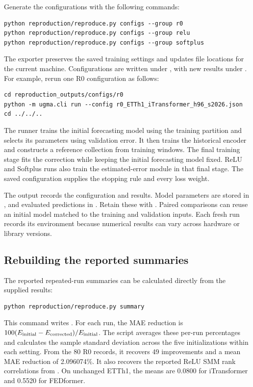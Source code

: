 Generate the configurations with the following commands:
\begin{lstlisting}
python reproduction/reproduce.py configs --group r0
python reproduction/reproduce.py configs --group relu
python reproduction/reproduce.py configs --group softplus
\end{lstlisting}
The exporter preserves the saved training settings and updates file locations for the current machine. Configurations are written under , with new results under . For example, rerun one R0 configuration as follows:
\begin{lstlisting}
cd reproduction_outputs/configs/r0
python -m ugma.cli run --config r0_ETTh1_iTransformer_h96_s2026.json
cd ../../..
\end{lstlisting}
The runner trains the initial forecasting model using the training partition and selects its parameters using validation error. It then trains the historical encoder and constructs a reference collection from training windows. The final training stage fits the correction while keeping the initial forecasting model fixed. ReLU and Softplus runs also train the estimated-error module in that final stage. The saved configuration supplies the stopping rule and every loss weight.

The output  records the configuration and results. Model parameters are stored in , and evaluated predictions in . Retain these with . Paired comparisons can reuse an initial model matched to the training and validation inputs. Each fresh run records its environment because numerical results can vary across hardware or library versions.

\subsection*{Rebuilding the reported summaries}
The reported repeated-run summaries can be calculated directly from the supplied results:
\begin{lstlisting}
python reproduction/reproduce.py summary
\end{lstlisting}
This command writes . For each run, the MAE reduction is $100(E_{\rm initial}-E_{\rm corrected})/E_{\rm initial}$. The script averages these per-run percentages and calculates the sample standard deviation across the five initializations within each setting. From the 80 R0 records, it recovers 49 improvements and a mean MAE reduction of 2.096074\%. It also recovers the reported ReLU SMM rank correlations from . On unchanged ETTh1, the means are 0.0800 for iTransformer and 0.5520 for FEDformer.


